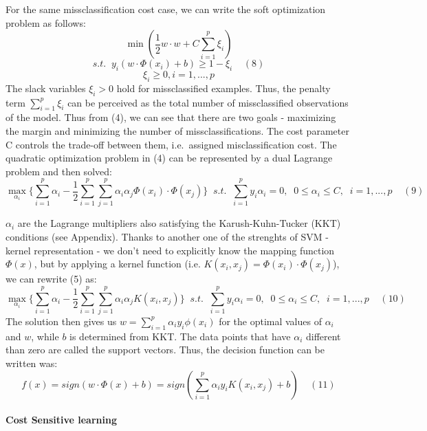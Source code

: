 \documentclass[12pt,]{article}
\let\oldparagraph\paragraph
\renewcommand{\paragraph}[1]{\oldparagraph{#1}\mbox{}}
\begin{document}
For the same missclassification cost case, we can write the soft
optimization problem as follows:
\[\min(\frac{1}{2}w \cdot w + C\sum_{i=1}^{p} \xi_i)\]
\[s.t. \;\; y_i(w \cdot \Phi(x_i) + b) \geq 1 - \xi_i\;\;\;\;(8) \]
\[\xi_i \geq 0, i = 1,...,p\] The slack variables \(\xi_i > 0\) hold for
missclassified examples. Thus, the penalty term \(\sum_{i=1}^{p}\xi_i\)
can be perceived as the total number of missclassified observations of
the model. Thus from (4), we can see that there are two goals -
maximizing the margin and minimizing the number of missclassifications.
The cost parameter C controls the trade-off between them, i.e.~assigned
misclassification cost. The quadratic optimization problem in (4) can be
represented by a dual Lagrange problem and then solved:
\[\max_{\alpha_i} \{ \sum_{i=1}^{p}{\alpha_i} - \frac{1}{2} \sum_{i=1}^{p}\sum_{j=1}^{p}{\alpha_i\alpha_j\Phi(x_i)\cdot\Phi(x_j)} \} \;\; s.t. \;\; \sum_{i=1}^{p}{y_i\alpha_i}=0, \;\; 0 \leq\alpha_i\leq C, \;\; i=1,...,p\;\;\;\;(9) \]

\(\alpha_i\) are the Lagrange multipliers also satisfying the
Karush-Kuhn-Tucker (KKT) conditions (see Appendix). Thanks to another
one of the strenghts of SVM - kernel representation - we don't need to
explicitly know the mapping function \(\Phi(x)\), but by applying a
kernel function (i.e. \(K(x_i,x_j) = \Phi(x_i)\cdot \Phi(x_j)\)), we can
rewrite (5) as:
\[\max_{\alpha_i} \{ \sum_{i=1}^{p}{\alpha_i} - \frac{1}{2} \sum_{i=1}^{p}\sum_{j=1}^{p}{\alpha_i\alpha_jK(x_i,x_j)} \} \;\; s.t. \;\; \sum_{i=1}^{p}{y_i\alpha_i}=0, \;\; 0 \leq\alpha_i\leq C, \;\; i=1,...,p\;\;\;\;(10)\]
The solution then gives us \(w = \sum_{i=1}^{p}{\alpha_iy_i}\phi(x_i)\)
for the optimal values of \(\alpha_i\) and \(w\), while \(b\) is
determined from KKT. The data points that have \(\alpha_i\) different
than zero are called the support vectors. Thus, the decision function
can be written was:
\[f(x) = sign(w \cdot \Phi(x) + b) = sign(\sum_{i=1}^{p}{\alpha_iy_i}K(x_i,x_j) + b)\;\;\;\;(11) \]

\hypertarget{cost-sensitive-learning}{%
\paragraph{Cost Sensitive learning}\label{cost-sensitive-learning}}
\end{document}

